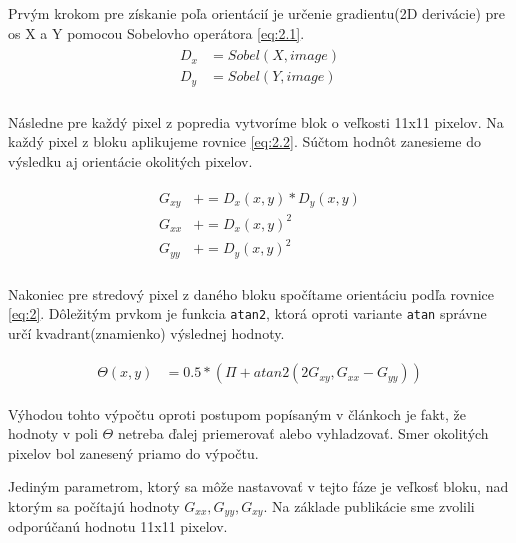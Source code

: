 \documentclass[11pt,a4paper]{article}
\begin{document}
Prvým krokom pre získanie poľa orientácií je určenie gradientu(2D derivácie) pre os X a Y pomocou Sobelovho operátora \ref{eq:2.1}.
\begin{align}
\begin{split}
D_x &= Sobel(X, image)\\
D_y &= Sobel(Y, image)\\ 
\end{split}
\label{eq:2.1}
\end{align}

Následne pre každý pixel z popredia vytvoríme blok o veľkosti 11x11 pixelov. Na každý pixel z bloku aplikujeme rovnice \ref{eq:2.2}. Súčtom hodnôt zanesieme do výsledku aj orientácie okolitých pixelov.

\begin{align}
\begin{split}
G_{xy} &+= D_x(x,y) * D_y(x,y)\\
G_{xx} &+= D_x(x,y)^2\\
G_{yy} &+= D_y(x,y)^2\\
\end{split}
\label{eq:2.2}
\end{align}

Nakoniec pre stredový pixel z daného bloku spočítame orientáciu podľa rovnice \ref{eq:2}. Dôležitým prvkom je funkcia \texttt{atan2}, ktorá oproti variante \texttt{atan} správne určí kvadrant(znamienko) výslednej hodnoty.

\begin{align}
\begin{split}
\Theta(x,y) &= 0.5 * (\Pi + atan2(2G_{xy}, G_{xx} - G_{yy}))
\end{split}
\label{eq:2}
\end{align}




Výhodou tohto výpočtu oproti postupom popísaným v článkoch \cite{hong, thai} je fakt, že hodnoty v poli $\Theta$ netreba ďalej priemerovať alebo vyhladzovať. Smer okolitých pixelov bol zanesený priamo do výpočtu.

Jediným parametrom, ktorý sa môže nastavovať v tejto fáze je veľkosť bloku, nad ktorým sa počítajú hodnoty $G_{xx}, G_{yy}, G_{xy}$. Na základe publikácie \cite{kniha} sme zvolili odporúčanú hodnotu 11x11 pixelov.
\end{document}

